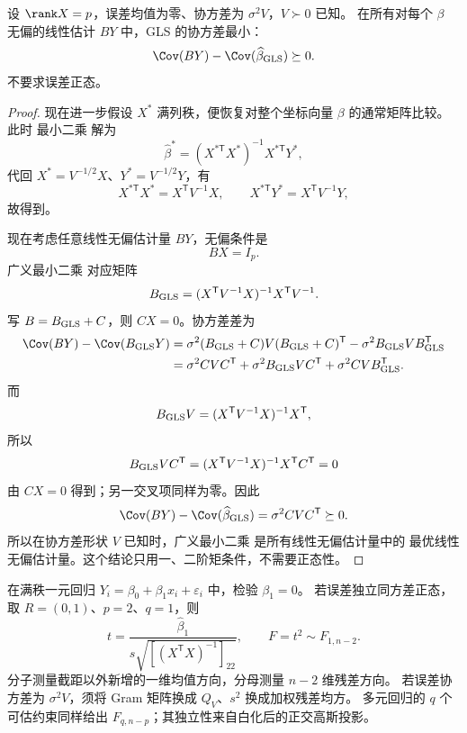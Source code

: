 \begin{theorem}

\label{thm:math-linear-gauss-markov}
设 $\rank X=p$，误差均值为零、协方差为 $\sigma^2V$，$V\succ0$ 已知。
在所有对每个 $\beta$ 无偏的线性估计 $BY$ 中，GLS 的协方差最小：
\[
 \Cov(BY)-\Cov(\widehat\beta_{\rm GLS})\succeq0.
\]
不要求误差正态。

\end{theorem}
\begin{proof}
现在进一步假设 $X^*$ 满列秩，便恢复对整个坐标向量 $\beta$ 的通常矩阵比较。此时 最小二乘 解为
\[
 \widehat\beta^*
 =(X^{*\mathsf T}X^*)^{-1}X^{*\mathsf T}Y^*,
\]
代回 $X^*=V^{-1/2}X$、$Y^*=V^{-1/2}Y$，有
\[
 X^{*\mathsf T}X^*=X^{\mathsf T}V^{-1}X,
 \qquad
 X^{*\mathsf T}Y^*=X^{\mathsf T}V^{-1}Y,
\]
故得到。

现在考虑任意线性无偏估计量 $BY$，无偏条件是
\[
 BX=I_p.
\]
广义最小二乘 对应矩阵
\[
 B_{\rm GLS}=(X^{\mathsf T}V^{-1}X)^{-1}X^{\mathsf T}V^{-1}.
\]
写 $B=B_{\rm GLS}+C$，则 $CX=0$。协方差差为
\begin{align*}
 \Cov(BY)-\Cov(B_{\rm GLS}Y)
 &=\sigma^2(B_{\rm GLS}+C)V(B_{\rm GLS}+C)^{\mathsf T}
   -\sigma^2B_{\rm GLS}VB_{\rm GLS}^{\mathsf T}\\
 &=\sigma^2CV C^{\mathsf T}
  +\sigma^2B_{\rm GLS}VC^{\mathsf T}
  +\sigma^2CV B_{\rm GLS}^{\mathsf T}.
\end{align*}
而
\[
 B_{\rm GLS}V
 =(X^{\mathsf T}V^{-1}X)^{-1}X^{\mathsf T},
\]
所以
\[
 B_{\rm GLS}VC^{\mathsf T}
 =(X^{\mathsf T}V^{-1}X)^{-1}X^{\mathsf T}C^{\mathsf T}
 =0
\]
由 $CX=0$ 得到；另一交叉项同样为零。因此
\[
 \Cov(BY)-\Cov(\widehat\beta_{\rm GLS})
 =\sigma^2CVC^{\mathsf T}\succeq0.
\]
所以在协方差形状 $V$ 已知时，广义最小二乘 是所有线性无偏估计量中的 最优线性无偏估计量。这个结论只用一、二阶矩条件，不需要正态性。
\end{proof}




\begin{workedexample}[斜率检验是一个新增方向]
在满秩一元回归 $Y_i=\beta_0+\beta_1x_i+\varepsilon_i$ 中，检验 $\beta_1=0$。
若误差独立同方差正态，取 $R=(0,1)$、$p=2$、$q=1$，则
\[
 t=\frac{\widehat\beta_1}{s\sqrt{[(X^{\mathsf T}X)^{-1}]_{22}}},\qquad
 F=t^2\sim F_{1,n-2}.
\]
分子测量截距以外新增的一维均值方向，分母测量 $n-2$ 维残差方向。
若误差协方差为 $\sigma^2V$，须将 Gram 矩阵换成 $Q_V$、$s^2$ 换成加权残差均方。
多元回归的 $q$ 个可估约束同样给出 $F_{q,n-p}$；其独立性来自白化后的正交高斯投影。
\end{workedexample}


